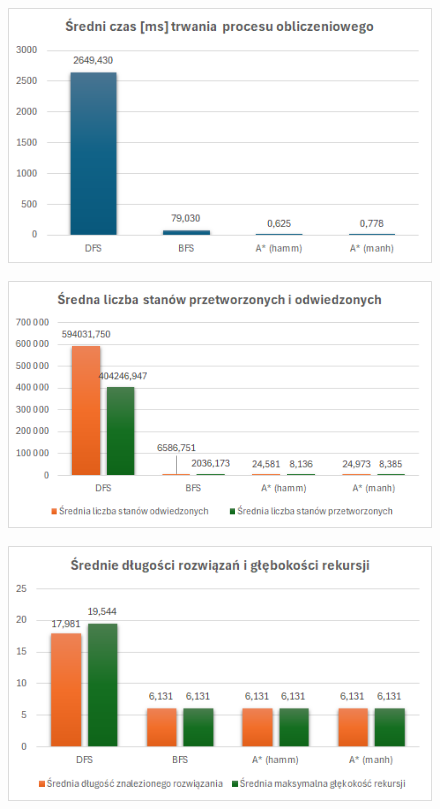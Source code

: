 \documentclass{classrep}
\begin{document}
    \begin{figure}
        \centering
        \includegraphics[width=\textwidth,height=\textheight,keepaspectratio]{average-time-with-dfs}
        \caption{}
        \label{fig:1}
    \end{figure}
    \begin{figure}
        \centering
        \includegraphics[width=\textwidth,height=\textheight,keepaspectratio]{average-count-of-visited-with-dfs}
        \caption{}
        \label{fig:2}
    \end{figure}
    \begin{figure}
        \centering
        \includegraphics[width=\textwidth,height=\textheight,keepaspectratio]{average-solution-lenghts}
        \caption{}
        \label{fig:3}
    \end{figure}
\end{document}
